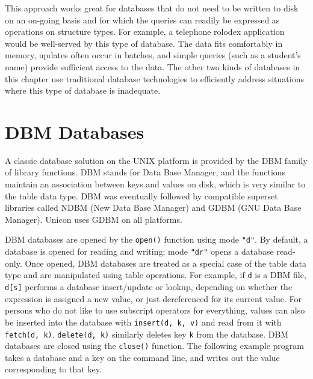 This approach works great for databases that do not need to be written
to disk on an on-going basis and for which the queries can readily be
expressed as operations on structure types. For example, a telephone
rolodex application would be well-served by this type of database. The
data fits comfortably in memory, updates often occur in batches, and
simple queries (such as a student's name) provide
sufficient access to the data. The other two kinds of databases in this
chapter use traditional database technologies to efficiently address
situations where this type of database is inadequate.

\section{DBM Databases}

A classic database solution on the UNIX platform is provided by the DBM
family of library functions. DBM stands for Data Base
Manager, and the functions maintain an association between keys and
values on disk, which is very similar to the table data type. DBM was
eventually followed by compatible superset libraries called NDBM (New
Data Base Manager) and GDBM (GNU Data Base Manager). Unicon uses GDBM
on all platforms.

DBM databases are opened by the \texttt{open()} function using mode
\texttt{"d"}. By default, a database is
opened for reading and writing; mode
\texttt{"dr"} opens a database read-only.
Once opened, DBM databases are treated as a special case of the table
data type and are manipulated using table operations. For example, if
\texttt{d} is a DBM file, \texttt{d[s]} performs a database
insert/update or lookup, depending on whether the expression is
assigned a new value, or just dereferenced for its
current value. For persons who do not like to use subscript operators for everything, values can also be
inserted into the database with \texttt{insert(d, k, v)} and read from it with
\texttt{fetch(d, k)}. \texttt{delete(d, k)} similarly deletes key \texttt{k} from
the database. DBM databases are closed using the \texttt{close()}
function. The following example program takes a database and a key on
the command line, and writes out the value corresponding to that key.


